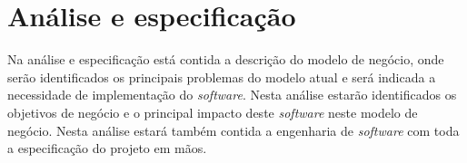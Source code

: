 
\chapter{Análise e especificação}

Na análise e especificação está contida a descrição do modelo de negócio, onde serão identificados os principais problemas do modelo atual e será indicada a necessidade de implementação do \textit{software}. Nesta análise estarão identificados os objetivos de negócio e o principal impacto deste \textit{software} neste modelo de negócio. Nesta análise estará também contida a engenharia de \textit{software} com toda a especificação do projeto em mãos.
